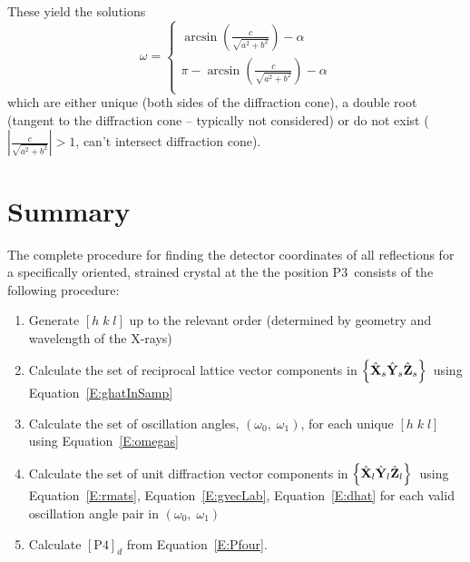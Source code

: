 \documentclass[12pt,letterpaper,final]{amsart}
\newcommand{\mbm}[1]{\ensuremath{\mbox{\boldmath$#1$}}}
\newcommand{\Pthree}{\ensuremath{\mathrm{P3}}}
\newcommand{\Pfour}{\ensuremath{\mathrm{P4}}}
\newcommand{\Xl}{\ensuremath{\hat{\mbm{\mathrm{X}}}_l}}
\newcommand{\Yl}{\ensuremath{\hat{\mbm{\mathrm{Y}}}_l}}
\newcommand{\Zl}{\ensuremath{\hat{\mbm{\mathrm{Z}}}_l}}
\newcommand{\labframe}{\ensuremath{\left\{\Xl\Yl\Zl\right\}}}
\newcommand{\Xs}{\ensuremath{\hat{\mbm{\mathrm{X}}}_s}}
\newcommand{\Ys}{\ensuremath{\hat{\mbm{\mathrm{Y}}}_s}}
\newcommand{\Zs}{\ensuremath{\hat{\mbm{\mathrm{Z}}}_s}}
\newcommand{\samframe}{\ensuremath{\left\{\Xs\Ys\Zs\right\}}}
\newcommand{\detcomps}[1]{\left[#1\right]_d}
\newcommand{\eqnref}[1]{Equation~\ref{#1}}
\newcommand{\xrays}{X-rays}
\begin{document}
These yield the solutions
\begin{equation}
    \omega = \left\{
        \begin{array}{r} 
            \arcsin{ \left( \frac{c}{\sqrt{a^2 + b^2}} \right) } - \alpha \\ 
            \pi - \arcsin{ \left(\frac{c}{\sqrt{a^2 + b^2}}\right) } - \alpha \\
        \end{array}
    \right. \label{E:omegas}
\end{equation}
which are either unique (both sides of the diffraction cone), a double root (tangent to the diffraction cone -- typically not considered) or do not exist ($|\frac{c}{\sqrt{a^2 + b^2}}| > 1$, can't intersect diffraction cone).

\section{Summary}\label{S:summary}
The complete procedure for finding the detector coordinates of all reflections for a specifically oriented, strained crystal at the the position \Pthree\ consists of the following procedure:
\begin{enumerate}
\item Generate $[h\; k\; l]$ up to the relevant order (determined by geometry and wavelength of the \xrays) \\
\item Calculate the set of reciprocal lattice vector components in \samframe\ using \eqnref{E:ghatInSamp} \\
\item Calculate the set of oscillation angles, $(\omega_0,\; \omega_1)$, for each unique $[h\; k\; l]$ using \eqnref{E:omegas}\\
\item Calculate the set of unit diffraction vector components in \labframe\ using \eqnref{E:rmats}, \eqnref{E:gvecLab}, \eqnref{E:dhat} for each valid oscillation angle pair in $(\omega_0,\; \omega_1)$\\
\item Calculate $\detcomps{\Pfour}$ from \eqnref{E:Pfour}.
\end{enumerate}

 


\end{document}
